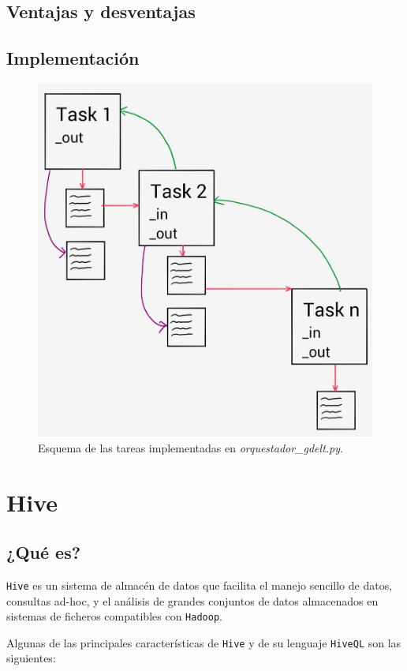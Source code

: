 \documentclass[]{article}
\begin{document}
\subsection{Ventajas y desventajas}\label{ventajas-y-desventajas-3}

\subsection{Implementación}\label{implementacion-4}

\begin{figure}[H]
\centering
\includegraphics[width=0.8 \textwidth]{img/luigi.jpg}
\caption{Esquema de las tareas implementadas en \emph{orquestador\_gdelt.py}.}
\end{figure}

\section{Hive}\label{hive}

\subsection{¿Qué es?}\label{que-es-4}

\texttt{Hive} es un sistema de almacén de datos que facilita el manejo
sencillo de datos, consultas ad-hoc, y el análisis de grandes conjuntos
de datos almacenados en sistemas de ficheros compatibles con
\texttt{Hadoop}.

Algunas de las principales características de \texttt{Hive} y de su
lenguaje \texttt{HiveQL} son las siguientes:
\end{document}
